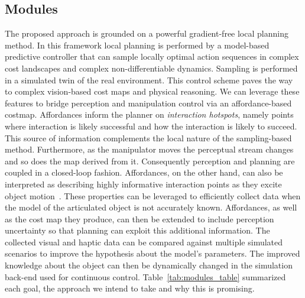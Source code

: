 \subsection{Modules}
The proposed approach is grounded on a powerful gradient-free local planning method. In this framework local planning is performed by a model-based predictive controller that can sample locally optimal action sequences in complex cost landscapes and complex non-differentiable dynamics. Sampling is performed in a simulated twin of the real environment. This control scheme paves the way to complex vision-based cost maps and physical reasoning. We can leverage these features to bridge perception and manipulation control via an affordance-based costmap. Affordances inform the planner on \emph{interaction hotspots}, namely points where interaction is likely successful and how the interaction is likely to succeed. This source of information complements the local nature of the sampling-based method. Furthermore, as the manipulator moves the perceptual stream changes and so does the map derived from it. Consequently perception and planning are coupled in a closed-loop fashion. Affordances, on the other hand, can also be interpreted as describing highly informative interaction points as they excite object motion~\cite{eppner2018physics}. These properties can be leveraged to efficiently collect data when the model of the articulated object is not accurately known. Affordances, as well as the cost map they produce, can then be extended to include perception uncertainty so that planning can exploit this additional information. The collected visual and haptic data can be compared against multiple simulated scenarios to improve the hypothesis about the model's parameters. The improved knowledge about the object can then be dynamically changed in the simulation back-end used for continuous control. Table~\ref{tab:modules_table} summarized each goal, the approach we intend to take and why this is promising.

